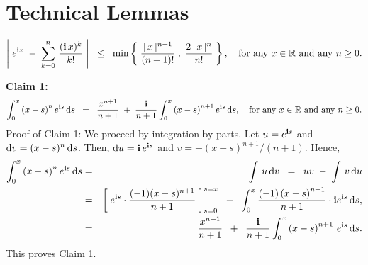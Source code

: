 

\section{Technical Lemmas}
\setcounter{theorem}{0}
\setcounter{equation}{0}

\renewcommand{\theenumi}{\alph{enumi}}
\renewcommand{\labelenumi}{\textnormal{(\theenumi)}$\;\;$}

\begin{lemma}
\label{BillingsleyThreeFourThree}
\mbox{}\vskip 0.2cm
\noindent
\begin{equation*}
\left\vert\;e^{\textnormal{\bf i} x} \;-\; \sum_{k = 0}^{n}\,\dfrac{(\textnormal{\bf i}\,x)^{k}}{k!} \;\right\vert
\;\;\leq\;\;
\min\left\{\;\dfrac{\vert\,x\,\vert^{n+1}}{(n+1)!}\;,\;\dfrac{2\,\vert\,x\,\vert^{n}}{n!}\;\right\},
\quad
\textnormal{for any $x \in \mathbb{R}$ and any $n \geq 0$.}
\end{equation*}
\end{lemma}
\proof
\begin{center}
\begin{minipage}{6.5in}
\noindent
\textbf{Claim 1:}
\begin{equation*}
\int_{0}^{x}\left(x-s\right)^{n}e^{\textnormal{\bf i} s}\,\textnormal{d} s
\;\;=\;\;
\dfrac{x^{n+1}}{n+1} \;+\; \dfrac{\textnormal{\bf i}}{n+1}\int_{0}^{x}\left(x-s\right)^{n+1}e^{\textnormal{\bf i} s}\,\textnormal{d} s,
\quad
\textnormal{for any $x \in \mathbb{R}$ and any $n \geq 0$.}
\end{equation*}
Proof of Claim 1: We proceed by integration by parts.
Let $u = e^{\textnormal{\bf i} s}$ and $\textnormal{d} v = (x-s)^{n}\,\textnormal{d} s$.
Then, $\textnormal{d} u = \textnormal{\bf i}\,e^{\textnormal{\bf i} s}$ and $v = -(x-s)^{n+1}/(n+1)$.
Hence,
\begin{eqnarray*}
\int_{0}^{x}\left(x-s\right)^{n}e^{\textnormal{\bf i} s}\,\textnormal{d} s
&=& \int\,u\,\textnormal{d} v
\;\;=\;\; uv \; - \; \int\,v\,\textnormal{d} u
\\
&=&
\left[\;e^{\textnormal{\bf i} s}\cdot\dfrac{(-1)(x-s)^{n+1}}{n+1}\;\right]_{s=0}^{s=x}
\;\; - \;\; \int_{0}^{x}\dfrac{(-1)\left(x-s\right)^{n+1}}{n+1}\cdot\textnormal{\bf i} e^{\textnormal{\bf i} s}\,\textnormal{d} s,
\\
&=&
\dfrac{x^{n+1}}{n+1} \;\; + \;\; \dfrac{\textnormal{\bf i}}{n+1}\int_{0}^{x}\left(x-s\right)^{n+1}\,e^{\textnormal{\bf i} s}\,\textnormal{d} s.
\end{eqnarray*}
This proves Claim 1.
\end{minipage}
\end{center}

